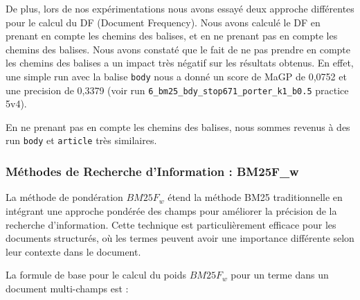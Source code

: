 \documentclass[a4paper, 12pt]{article}
\begin{document}
\begin{table}[!h]
  \centering
  \caption{Résultats de la méthode BM25 avec ciblage de balises}
\end{table}

De plus, lors de nos expérimentations nous avons essayé deux approche différentes pour le 
calcul du DF (Document Frequency). 
Nous avons calculé le DF en prenant en compte les chemins des balises, et en ne prenant pas en compte les chemins des balises.
Nous avons constaté que le fait de ne pas prendre en compte les chemins des balises a un impact très négatif sur les résultats obtenus.
En effet, une simple run avec la balise \texttt{body} nous a donné un 
score de MaGP de 0,0752 et une precision de 0,3379 (voir run \texttt{6\_bm25\_bdy\_stop671\_porter\_k1\_b0.5} practice 5v4).

En ne prenant pas en compte les chemins des balises, nous sommes revenus à des run 
\texttt{body} et \texttt{article} très similaires.


\subsubsection{Méthodes de Recherche d'Information : BM25F_w}

La méthode de pondération $BM25F_w$ étend la méthode BM25 traditionnelle en intégrant une approche pondérée des champs pour améliorer la précision de la recherche d'information. Cette technique est particulièrement efficace pour les documents structurés, où les termes peuvent avoir une importance différente selon leur contexte dans le document.

La formule de base pour le calcul du poids $BM25F_w$ pour un terme dans un document multi-champs est :
\end{document}
